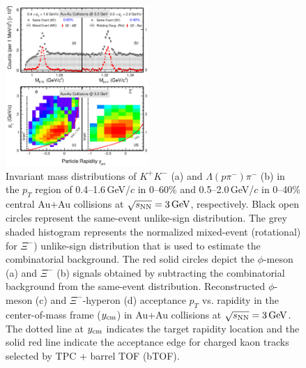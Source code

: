 \documentclass[%
 reprint,	
showpacs,
 amsmath,amssymb,
 aps,
 prc,
]{revtex4-1}
\begin{document}
\begin{figure}
\centering
\hspace*{-4mm}
\includegraphics[width=0.48\textwidth]{fig/fig1_signal.eps}
  \caption{Invariant mass distributions of $K^+K^-$ (a) and $\Lambda(p\pi^-)\pi^-$ (b) in the $p_T$ region of 0.4--1.6\,GeV/$c$ in 0--60\% and 0.5--2.0\,GeV/$c$ in 0--40\% central Au+Au collisions at ${\sqrt{s_{\rm NN}} = \rm{3\,GeV}}$, respectively. Black open circles represent the same-event unlike-sign distribution. The grey shaded histogram represents the normalized mixed-event (rotational) for $\Xi^-$) unlike-sign distribution that is used to estimate the combinatorial background. The red solid circles depict the $\phi$-meson (a) and $\Xi^-$ (b) signals obtained by subtracting the combinatorial background from the same-event distribution. Reconstructed $\phi$-meson (c) and $\Xi^-$-hyperon (d) acceptance $p_T$ vs. rapidity in the center-of-mass frame ($y_{\rm cm}$) in Au+Au collisions at ${\sqrt{s_{\rm NN}} = \rm{3\,GeV}}$. The dotted line at $y_{\rm cm}$ indicates the target rapidity location and the solid red line indicate the acceptance edge for charged kaon tracks selected by TPC + barrel TOF (bTOF).}
\label{fig:phiSignal} 
\end{figure}
\end{document}
